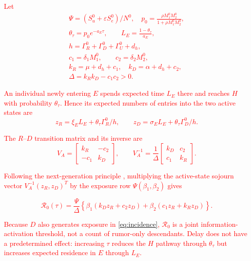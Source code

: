 \documentclass[letterpaper,journal]{IEEEtran}
\begin{document}
	\textcolor{red}{
	Let
	\begin{gather*}
	\Psi=(S_u^0+\varepsilon S_e^0)/N^0,\quad
	p_0=\frac{\rho M_1^0M_2^0}{1+\rho M_1^0M_2^0},\\
	\theta_\tau=p_0e^{-a_E\tau},\qquad
	L_E=\frac{1-\theta_\tau}{a_E},\\
	h=\Gamma_R^0+\Gamma_D^0+\Gamma_U^0+d_h,\\
	c_1=\delta_1M_1^0,\qquad c_2=\delta_2M_2^0,\\
	k_R=\mu+d_h+c_1,\quad k_D=\alpha+d_h+c_2,\\
	\Delta=k_Rk_D-c_1c_2>0.
	\end{gather*}
	}

	\textcolor{red}{An individual newly entering $E$ spends expected time $L_E$ there and reaches $H$ with probability $\theta_\tau$. Hence its expected numbers of entries into the two active states are}
	\textcolor{red}{
	\begin{equation}
		z_R=\xi_EL_E+\theta_\tau\Gamma_R^0/h,\qquad
		z_D=\sigma_EL_E+\theta_\tau\Gamma_D^0/h.
		\label{eq:entry_vector}
	\end{equation}
	}
	
	\textcolor{red}{The $R$--$D$ transition matrix and its inverse are}
	\textcolor{red}{
	\begin{equation*}
	V_A=\begin{bmatrix}k_R&-c_2\\-c_1&k_D\end{bmatrix},\qquad
	V_A^{-1}=\frac1\Delta\begin{bmatrix}k_D&c_2\\c_1&k_R\end{bmatrix}.
	\end{equation*}
	}
	
	\textcolor{red}{Following the next-generation principle \cite{vandendriessche2002}, multiplying the active-state sojourn vector $V_A^{-1}(z_R,z_D)^T$ by the exposure row $\Psi(\beta_1,\beta_2)$ gives}
	
	\textcolor{red}{
	\begin{equation}
	\mathcal R_0(\tau)=\frac{\Psi}{\Delta}
	\left\{\beta_1(k_Dz_R+c_2z_D)+\beta_2(c_1z_R+k_Rz_D)\right\}.
	\label{eq:R0}
	\end{equation}}
	
	\textcolor{red}{Because $D$ also generates exposure in \eqref{eq:incidence}, $\mathcal R_0$ is a joint information-activation threshold, not a count of rumor-only descendants. Delay does not have a predetermined effect: increasing $\tau$ reduces the $H$ pathway through $\theta_\tau$ but increases expected residence in $E$ through $L_E$.}
\end{document}
